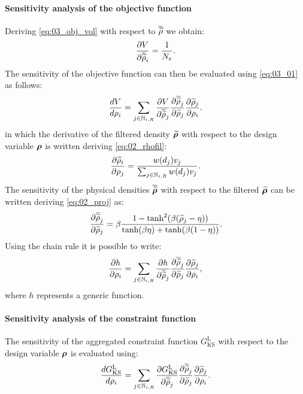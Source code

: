 \paragraph{Sensitivity analysis of the objective function}
Deriving \eqref{eq:03_obj_vol} with respect to $\overline{\widetilde{\rho}}$ we obtain:
\begin{equation}
    \frac{\partial V}{\partial\overline{\widetilde{\rho}}_i} = \frac{1}{N_{e}}.
    \label{eq:03_01}
\end{equation}
The sensitivity of the objective function can then be evaluated using \eqref{eq:03_01} as follows:
\begin{equation}
    \frac{d V}{d \rho_i} = \sum_{j \in \mathbb{N}_{i,R}} \frac{\partial V}{\partial\overline{\widetilde{\rho}}_j} \frac{\partial\overline{\widetilde{\rho}}_j}{\partial\widetilde{\rho}_j} \frac{\partial\widetilde{\rho}_j}{\partial\rho_i}.
\end{equation}
in  which the derivative of the filtered density $\bm{\widetilde{\rho}}$ with respect to the design variable $\bm{\rho}$ is written deriving \eqref{eq:02_rhofil}:
\begin{equation}
    \frac{\partial\widetilde{\rho}_i}{\partial\rho_j} = \frac{w(d_j)v_j}{\sum_{j \in \mathbb{N}_{i,R}} w(d_j)v_j}.
    \label{eq:03_sens_filt}
\end{equation}
The  sensitivity of the physical densities $\bm{\overline{\widetilde{\rho}}}$ with respect to the filtered $\bm{\widetilde{\rho}}$ can be written deriving \eqref{eq:02_proj} as:
\begin{equation}
    \frac{\partial\overline{\widetilde{\rho}}_j}{\partial\widetilde{\rho}_j} = \beta \frac{1-\tanh^2(\beta(\widetilde{\rho}_j-\eta))}{\tanh(\beta\eta)+\tanh(\beta(1 - \eta))}.
    \label{eq:03_sens_proj}
\end{equation}
Using the chain rule it is possible to write:
\begin{equation}
    \label{eq:03_chain}
    \frac{\partial h}{\partial\rho_i} = \sum_{j \in \mathbb{N}_{i,R}} \frac{\partial h}{\partial\overline{\widetilde{\rho}}_j} \frac{\partial\overline{\widetilde{\rho}}_j}{\partial\widetilde{\rho}_j} \frac{\partial\widetilde{\rho}_j}{\partial\rho_i},
\end{equation}
where $h$ represents a generic function.
\paragraph{Sensitivity analysis of the constraint function}
The sensitivity of the aggregated constraint function $G_{\text{KS}}^\text{L}$ with respect to the design variable $\bm{\rho}$ is evaluated using:
\begin{equation} \label{eq:03_chain_sens_fin}
    \frac{d G_{\text{KS}}^\text{L}}{d \rho_i} = \sum_{j \in \mathbb{N}_{i,R}} \frac{\partial G_{\text{KS}}^\text{L}}{\partial\overline{\widetilde{\rho}}_j} \frac{\partial\overline{\widetilde{\rho}}_j}{\partial\widetilde{\rho}_j} \frac{\partial\widetilde{\rho}_j}{\partial\rho_i}.
\end{equation}

